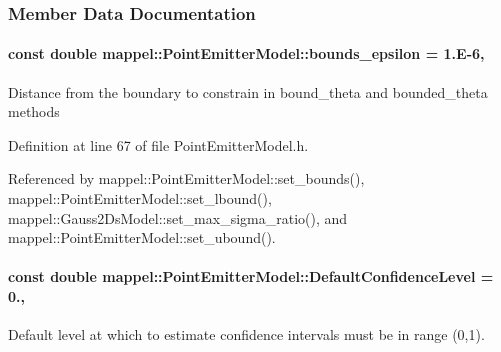 \subsubsection{Member Data Documentation}
\paragraph[{\texorpdfstring{bounds\+\_\+epsilon}{bounds_epsilon}}]{\setlength{\rightskip}{0pt plus 5cm}const double mappel\+::\+Point\+Emitter\+Model\+::bounds\+\_\+epsilon = 1.\+E-\/6\hspace{0.3cm}{\ttfamily [static]}, {\ttfamily [inherited]}}\hypertarget{classmappel_1_1PointEmitterModel_ac987a119137b85a27704b1c40e3fab8c}{}\label{classmappel_1_1PointEmitterModel_ac987a119137b85a27704b1c40e3fab8c}
Distance from the boundary to constrain in bound\+\_\+theta and bounded\+\_\+theta methods 

Definition at line 67 of file Point\+Emitter\+Model.\+h.



Referenced by mappel\+::\+Point\+Emitter\+Model\+::set\+\_\+bounds(), mappel\+::\+Point\+Emitter\+Model\+::set\+\_\+lbound(), mappel\+::\+Gauss2\+Ds\+Model\+::set\+\_\+max\+\_\+sigma\+\_\+ratio(), and mappel\+::\+Point\+Emitter\+Model\+::set\+\_\+ubound().

\paragraph[{\texorpdfstring{Default\+Confidence\+Level}{DefaultConfidenceLevel}}]{\setlength{\rightskip}{0pt plus 5cm}const double mappel\+::\+Point\+Emitter\+Model\+::\+Default\+Confidence\+Level = 0.\hspace{0.3cm}{\ttfamily [static]}, {\ttfamily [inherited]}}\hypertarget{classmappel_1_1PointEmitterModel_ac57f7550589dcdbf3b6281e91d3e24ff}{}\label{classmappel_1_1PointEmitterModel_ac57f7550589dcdbf3b6281e91d3e24ff}


Default level at which to estimate confidence intervals must be in range (0,1). 



